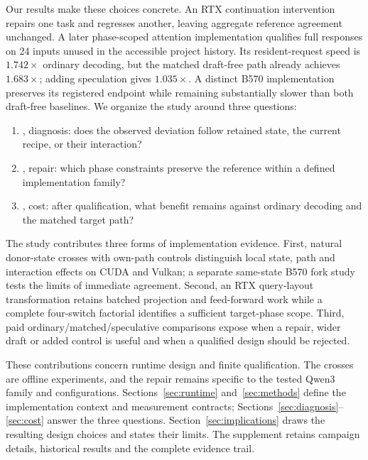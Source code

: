 Our results make these choices concrete. An RTX continuation intervention repairs one task and regresses another, leaving aggregate reference agreement unchanged. A later phase-scoped attention implementation qualifies full responses on 24 inputs unused in the accessible project history. Its resident-request speed is $1.742\times$ ordinary decoding, but the matched draft-free path already achieves $1.683\times$; adding speculation gives $1.035\times$. A distinct B570 implementation preserves its registered endpoint while remaining substantially slower than both draft-free baselines. We organize the study around three questions:
\begin{enumerate}
\item {}, diagnosis: does the observed deviation follow retained state, the current recipe, or their interaction?
\item {}, repair: which phase constraints preserve the reference within a defined implementation family?
\item {}, cost: after qualification, what benefit remains against ordinary decoding and the matched target path?
\end{enumerate}

The study contributes three forms of implementation evidence. First, natural donor-state crosses with own-path controls distinguish local state, path and interaction effects on CUDA and Vulkan; a separate same-state B570 fork study tests the limits of immediate agreement. Second, an RTX query-layout transformation retains batched projection and feed-forward work while a complete four-switch factorial identifies a sufficient target-phase scope. Third, paid ordinary/matched/speculative comparisons expose when a repair, wider draft or added control is useful and when a qualified design should be rejected.

These contributions concern runtime design and finite qualification. The crosses are offline experiments, and the repair remains specific to the tested Qwen3 family and configurations. Sections~\ref{sec:runtime} and~\ref{sec:methods} define the implementation context and measurement contracts; Sections~\ref{sec:diagnosis}--\ref{sec:cost} answer the three questions. Section~\ref{sec:implications} draws the resulting design choices and states their limits. The supplement retains campaign details, historical results and the complete evidence trail.
